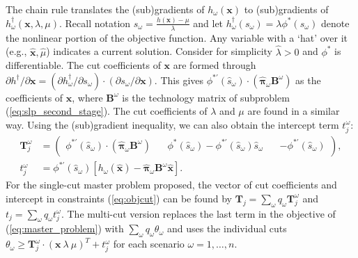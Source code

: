 \documentclass[opre,nonblindrev]{informs3} %
\newcommand{\x}{\mathbf{x}}
\newcommand{\xh}{\hat{\x}}
\newcommand{\lh}{\hat{\lambda}}
\newcommand{\mh}{\hat{\mu}}
\newcommand{\bpi}{\mathbf{\pi}}
\newcommand{\bpih}{\hat{\bpi}}
\newcommand{\B}{\mathbf{B}}
\newcommand{\T}{\mathbf{T}}
\newcommand{\plp}{$\phi$LP-2}
\begin{document}
The chain rule translates the (sub)gradients of $h_\omega(\x)$ to (sub)gradients of $h^{\dagger}_\omega(\x,\lambda,\mu)$. 
Recall notation $s_\omega = \frac{h(\x)-\mu}{\lambda}$ and let $h^\dagger_\omega(s_\omega) = \lambda \phi^*\left(s_\omega \right)$ denote the nonlinear portion of the objective function. 
Any variable with a `hat' over it (e.g., $\xh, \mh$) indicates a current solution.
Consider for simplicity $\hat{\lambda} > 0$ and $\phi^*$ is differentiable.
The cut coefficients of $\x$ are formed through $\partial h^\dagger / \partial \x = (\partial h^\dagger_\omega/\partial s_\omega) \cdot (\partial s_\omega/\partial \x)$. 
This gives $\phi^{* \prime}(\hat{s}_\omega)\cdot(\bpih_\omega \B^\omega)$ as the coefficients of $\x$, where $\B^\omega$ is the technology matrix of subproblem (\ref{eq:slp_second_stage}). 
The cut coefficients of $\lambda$ and $\mu$ are found in a similar way. 
Using the (sub)gradient inequality, we can also obtain the intercept term $t_j^\omega$:
\begin{align*}
	\T_j^\omega & = 
	\left( \begin{array}{ccc}
		\phi^{*\prime}(\hat{s}_\omega) \cdot (\bpih_\omega \B^\omega) \ \ \ \  
			 & \phi^*(\hat{s}_\omega) - \phi^{*\prime}(\hat{s}_\omega) \hat{s}_\omega \ \ \ \ 
			 & -\phi^{*\prime}(\hat{s}_\omega)
	\end{array} \right), \\
	t_j^\omega & =  \phi^{*\prime}(\hat{s}_\omega)\left[ h_\omega(\xh) - \bpih_\omega \B^\omega \xh \right].
\end{align*}
For the single-cut master problem proposed, the vector of cut coefficients and intercept in constraints (\ref{eq:objcut}) can be found by
 $\T_j = \sum_{\omega} q_\omega \T_j^\omega$ and $t_j = \sum_\omega q_\omega t_j^\omega$. 
The multi-cut version replaces the last term in the objective of (\ref{eq:master_problem}) with $\sum_\omega q_\omega \theta_\omega$ and uses the individual cuts $\theta_\omega \geq \T_j^\omega \cdot (\x\  \lambda\ \mu)^{T} + t_j^\omega$ for each scenario $\omega = 1, \ldots, n$. 
\end{document}
